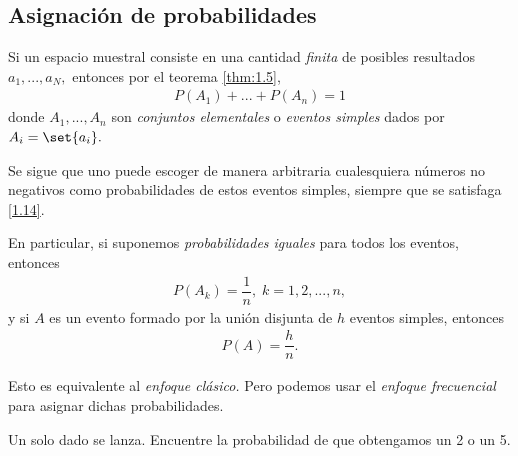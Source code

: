 \subsection{Asignación de probabilidades}
 {}
 Si un espacio muestral consiste en una cantidad \emph{finita} de posibles resultados $a_{1},...,a_{N},$ entonces por el teorema \ref{thm:1.5},
 \begin{align}
  \label{1.14}
  P(A_{1})+...+P(A_{n})=1
 \end{align}
 donde $A_{1},...,A_{n}$ son \emph{conjuntos elementales} o \emph{eventos simples} dados por $A_{i}=\set{a_{i}}.$


{}
Se sigue que uno puede escoger de manera arbitraria cualesquiera números no negativos como probabilidades de estos eventos simples, siempre que se satisfaga \eqref{1.14}. 

En particular, si suponemos \emph{probabilidades iguales} para todos los eventos, entonces
\begin{align}
 \label{1.15}
 P(A_{k})=\dfrac{1}{n}, \; k=1,2,...,n,
\end{align}
y si $A$ es un evento formado por la unión disjunta de $h$ eventos simples, entonces
\begin{align}
	\label{1.16}
 P(A)=\dfrac{h}{n}.
\end{align}


{}
\begin{rem}
 Esto es equivalente al \textit{enfoque clásico.} Pero podemos usar el \textit{enfoque frecuencial} para asignar dichas probabilidades.
\end{rem}


{}
\begin{ejemplo}
 \label{exmp:1.12}
 Un solo dado se lanza. Encuentre la probabilidad de que obtengamos un 2 o un 5.
\end{ejemplo}



